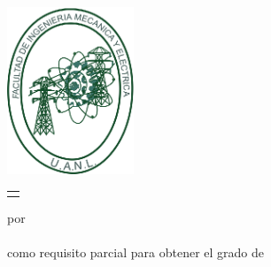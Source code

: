 \begin{scshape}
\begin{center}
	{\Large \uanl} \\[5mm]
	{\large \fime} \\[5mm]
	{\large \depg}
	\vskip 16mm
	\includegraphics[height=50mm]{fime}
	\vskip 16mm
	\begin{tabular}{p{11cm}}
		\centering
		{\large \titulo}
	\end{tabular}
	\vskip 7mm
	{por}\\[7mm]
	{\large \autor}\\[7mm]
	{como requisito parcial para obtener el grado de}\\[3mm]
	\MakeUppercase{\grado}\\
	\orientacion
	\vfill
	\fecha
\end{center}
\end{scshape}

\newpage
\thispagestyle{empty}
\enlargethispage{8mm}

